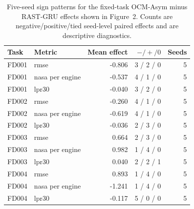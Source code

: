\begin{table}[!t]
\centering
\small
\caption{Five-seed sign patterns for the fixed-task OCM-Asym minus RAST-GRU effects shown in Figure~2. Counts are negative/positive/tied seed-level paired effects and are descriptive diagnostics.}
\label{tab:primary-seed-sign-patterns}
\begin{tabular}{llrrr}
\toprule
Task & Metric & Mean effect & $- / + / 0$ & Seeds \\
\midrule
FD001 & rmse & -0.806 & 3 / 2 / 0 & 5 \\
FD001 & nasa per engine & -0.537 & 4 / 1 / 0 & 5 \\
FD001 & lpr30 & -0.040 & 3 / 2 / 0 & 5 \\
FD002 & rmse & -0.260 & 4 / 1 / 0 & 5 \\
FD002 & nasa per engine & -0.619 & 4 / 1 / 0 & 5 \\
FD002 & lpr30 & -0.036 & 2 / 3 / 0 & 5 \\
FD003 & rmse & 0.664 & 2 / 3 / 0 & 5 \\
FD003 & nasa per engine & 0.982 & 1 / 4 / 0 & 5 \\
FD003 & lpr30 & 0.040 & 2 / 2 / 1 & 5 \\
FD004 & rmse & 0.893 & 1 / 4 / 0 & 5 \\
FD004 & nasa per engine & -1.241 & 1 / 4 / 0 & 5 \\
FD004 & lpr30 & -0.117 & 5 / 0 / 0 & 5 \\
\bottomrule
\end{tabular}
\end{table}

